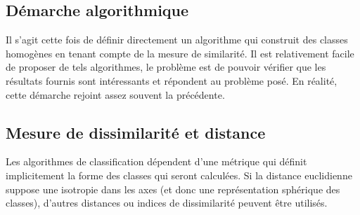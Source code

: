 \documentclass[letterpaper,10pt,french]{sphinxmanual}
\begin{document}
\subsection{Démarche algorithmique}
\label{\detokenize{clustering:demarche-algorithmique}}
\sphinxAtStartPar
Il s’agit cette fois de définir directement un algorithme qui construit des classes homogènes en tenant compte de la mesure de similarité. Il est relativement facile de proposer de tels algorithmes, le problème est de pouvoir vérifier que les résultats fournis sont intéressants et répondent au problème posé. En réalité, cette démarche rejoint assez souvent la précédente.


\subsection{Mesure de dissimilarité et distance}
\label{\detokenize{clustering:mesure-de-dissimilarite-et-distance}}
\sphinxAtStartPar
Les algorithmes de classification dépendent d’une métrique qui définit implicitement la forme des classes qui seront calculées. Si la distance euclidienne suppose une isotropie dans les axes (et donc une représentation sphérique des classes), d’autres distances ou indices de dissimilarité peuvent être utilisés.
\end{document}
